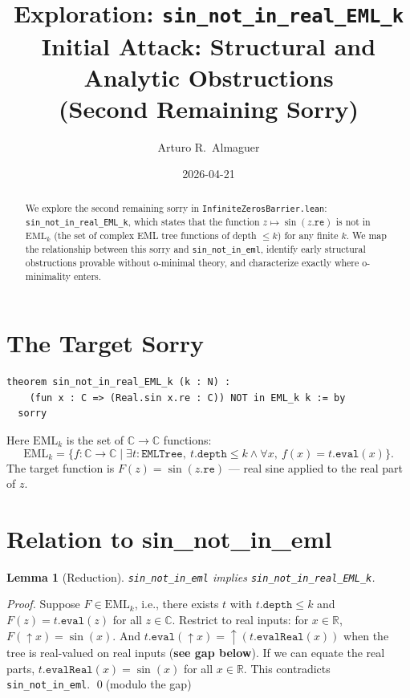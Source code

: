 \documentclass[12pt]{article}
\title{\textbf{Exploration: \texttt{sin\_not\_in\_real\_EML\_k}}\\[0.4em]
\large Initial Attack: Structural and Analytic Obstructions\\
\normalsize (Second Remaining Sorry)}
\author{Arturo R.\ Almaguer}
\date{2026-04-21}
\newtheorem{lemma}[theorem]{Lemma}
\begin{document}
\maketitle

\begin{abstract}
We explore the second remaining sorry in \texttt{InfiniteZerosBarrier.lean}:
\texttt{sin\_not\_in\_real\_EML\_k}, which states that the function
$z \mapsto \sin(z.\mathtt{re})$ is not in $\mathrm{EML}_k$ (the set of complex
EML tree functions of depth $\leq k$) for any finite $k$.
We map the relationship between this sorry and \texttt{sin\_not\_in\_eml},
identify early structural obstructions provable without o-minimal theory,
and characterize exactly where o-minimality enters.
\end{abstract}

\section{The Target Sorry}

\begin{verbatim}
theorem sin_not_in_real_EML_k (k : N) :
    (fun x : C => (Real.sin x.re : C)) NOT in EML_k k := by
  sorry
\end{verbatim}

Here $\mathrm{EML}_k$ is the set of $\mathbb{C} \to \mathbb{C}$ functions:
\[
  \mathrm{EML}_k = \{f : \mathbb{C} \to \mathbb{C} \mid \exists t : \mathtt{EMLTree},\ t.\mathtt{depth} \leq k \land \forall x,\ f(x) = t.\mathtt{eval}(x)\}.
\]
The target function is $F(z) = \sin(z.\mathtt{re})$ — real sine applied to the real part of $z$.

\section{Relation to sin\_not\_in\_eml}

\begin{lemma}[Reduction]\label{lem:reduction}
\texttt{sin\_not\_in\_eml} implies \texttt{sin\_not\_in\_real\_EML\_k}.
\end{lemma}

\begin{proof}
Suppose $F \in \mathrm{EML}_k$, i.e., there exists $t$ with $t.\mathtt{depth} \leq k$
and $F(z) = t.\mathtt{eval}(z)$ for all $z \in \mathbb{C}$.
Restrict to real inputs: for $x \in \mathbb{R}$, $F(\uparrow\!x) = \sin(x)$.
And $t.\mathtt{eval}(\uparrow\!x) = \uparrow(t.\mathtt{evalReal}(x))$ when the
tree is real-valued on real inputs (\textbf{see gap below}).
If we can equate the real parts, $t.\mathtt{evalReal}(x) = \sin(x)$ for all $x \in \mathbb{R}$.
This contradicts \texttt{sin\_not\_in\_eml}. \qed (modulo the gap)
\end{proof}
\end{document}
